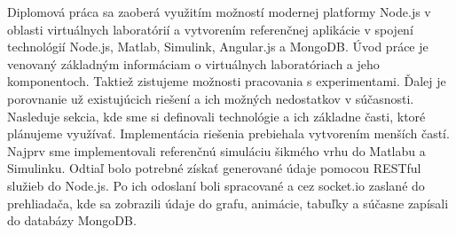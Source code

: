 Diplomová práca sa zaoberá využitím možností modernej platformy Node.js v oblasti virtuálnych laboratórií a vytvorením referenčnej aplikácie v spojení technológií Node.js, Matlab, Simulink, Angular.js a MongoDB. Úvod práce je venovaný základným informáciam o virtuálnych laboratóriach a jeho komponentoch. Taktiež zistujeme možnosti pracovania s experimentami. Ďalej je porovnanie už existujúcich riešení a ich možných nedostatkov v súčasnosti. Nasleduje sekcia, kde sme si definovali technológie a ich základne časti, ktoré plánujeme využívať. Implementácia riešenia prebiehala vytvorením menších častí. Najprv sme implementovali referenčnú simuláciu šikmého vrhu do Matlabu a Simulinku. Odtiaľ bolo potrebné získať generované údaje pomocou RESTful služieb do Node.js. Po ich odoslaní boli spracované a cez socket.io zaslané do prehliadača, kde sa zobrazili údaje do grafu, animácie, tabuľky a súčasne zapísali do databázy MongoDB.